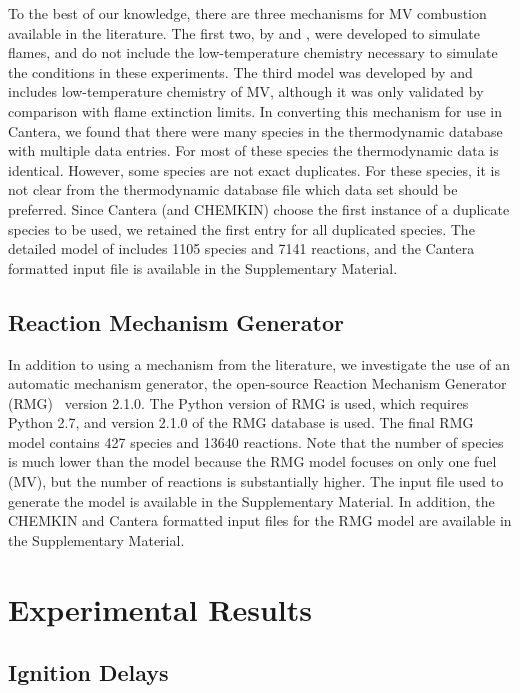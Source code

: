 \documentclass[letterpaper, review, sort&compress]{elsarticle}
\begin{document}
To the best of our knowledge, there are three mechanisms for MV combustion available in the
literature. The first two, by \citet{Korobeinichev2015} and \citet{Dmitriev2015}, were developed to
simulate flames, and do not include the low-temperature chemistry necessary to simulate the
conditions in these experiments. The third model was developed by \citet{Dievart2013} and includes
low-temperature chemistry of MV, although it was only validated by comparison with flame extinction
limits. In converting this mechanism for use in Cantera, we found that there were many species in
the thermodynamic database with multiple data entries. For most of these species the thermodynamic
data is identical. However, some species are not exact duplicates. For these species, it is not
clear from the thermodynamic database file which data set should be preferred. Since Cantera (and
CHEMKIN) choose the first instance of a duplicate species to be used, we retained the first entry
for all duplicated species. The detailed model of \citet{Dievart2013} includes 1105 species and 7141
reactions, and the Cantera formatted input file is available in the Supplementary Material.

\subsection{Reaction Mechanism Generator}\label{sec:reaction-mechanism-generator}

In addition to using a mechanism from the literature, we investigate the use of an automatic
mechanism generator, the open-source Reaction Mechanism Generator (RMG)~\cite{Allen2012} version
2.1.0. The Python version of RMG is used, which requires Python 2.7, and version 2.1.0 of the RMG
database is used. The final RMG model contains 427 species and 13640 reactions. Note that the number
of species is much lower than the \citet{Dievart2013} model because the RMG model focuses on only
one fuel (MV), but the number of reactions is substantially higher. The input file used to generate
the model is available in the Supplementary Material. In addition, the CHEMKIN and Cantera formatted
input files for the RMG model are available in the Supplementary Material.

\section{Experimental Results}\label{sec:experimental-results}
\subsection{Ignition Delays}\label{sec:ignition-delays}
\end{document}
